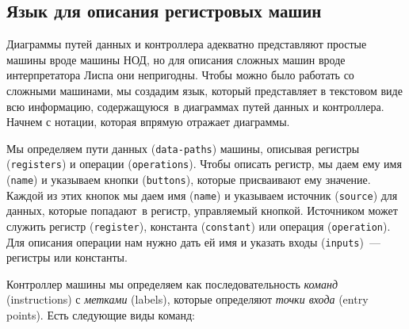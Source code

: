 \subsection{Язык для описания регистровых машин}
\label{A-LANGUAGE-FOR-DESCRIBING-REGISTER-MACHINES}

Диаграммы путей данных и контроллера адекватно
представляют простые машины вроде машины НОД, но для описания сложных
машин вроде интерпретатора Лиспа они непригодны.  Чтобы можно было
работать со сложными машинами, мы создадим язык, который представляет
в текстовом виде всю информацию, содержащуюся~в диаграммах путей
данных и контроллера.  Начнем с нотации, которая впрямую отражает
диаграммы.

Мы определяем пути данных ({\tt data-paths}) машины, описывая регистры
({\tt registers}) и
операции ({\tt operations}).  Чтобы описать регистр, мы даем
ему имя ({\tt name}) и указываем кнопки ({\tt buttons}),
которые присваивают ему значение.  Каждой из этих кнопок мы даем имя
({\tt name}) и
указываем источник ({\tt source}) для данных, которые попадают~в регистр, управляемый
кнопкой.  Источником может служить регистр ({\tt register}),
константа ({\tt constant}) или операция ({\tt operation}).
Для описания операции нам нужно дать ей имя и указать входы
({\tt inputs})~--- регистры или константы.

Контроллер машины мы определяем как последовательность
{\em команд} (in\-struc\-ti\-ons) с 
{\em метками} (labels),
которые определяют
{\em точки входа} (entry points).  Есть
следующие виды команд:

